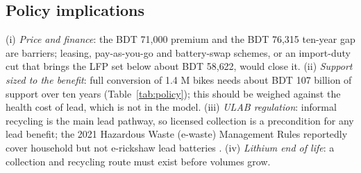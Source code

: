 \documentclass[11pt,a4paper]{article}
\newcommand{\gapLFP}{76{,}315}
\newcommand{\beP}{58{,}622}
\newcommand{\premium}{71{,}000}
\newcommand{\suppFull}{107}
\begin{document}
\subsection{Policy implications}
(i) \emph{Price and finance}: the BDT \premium{} premium and the BDT \gapLFP{} ten-year gap are barriers; leasing, pay-as-you-go and battery-swap schemes, or an import-duty cut that brings the LFP set below about BDT \beP{}, would close it. (ii) \emph{Support sized to the benefit}: full conversion of 1.4 M bikes needs about BDT \suppFull{} billion of support over ten years (Table~\ref{tab:policy}); this should be weighed against the health cost of lead, which is not in the model. (iii) \emph{ULAB regulation}: informal recycling is the main lead pathway, so licensed collection is a precondition for any lead benefit; the 2021 Hazardous Waste (e-waste) Management Rules reportedly cover household but not e-rickshaw lead batteries \cite{smep2024}. (iv) \emph{Lithium end of life}: a collection and recycling route must exist before volumes grow.
\end{document}
